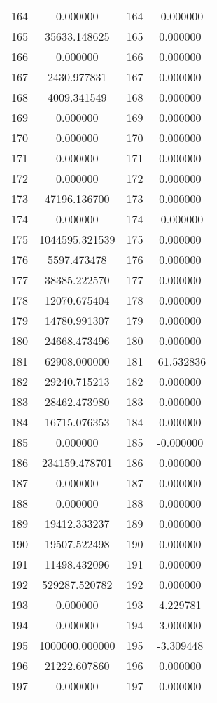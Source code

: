 \documentclass[12pt]{article}
\begin{document}
\begin{longtable}{@{}cccc@{}}
164 & 0.000000 & 164 & -0.000000 \\
165 & 35633.148625 & 165 & 0.000000 \\
166 & 0.000000 & 166 & 0.000000 \\
167 & 2430.977831 & 167 & 0.000000 \\
168 & 4009.341549 & 168 & 0.000000 \\
169 & 0.000000 & 169 & 0.000000 \\
170 & 0.000000 & 170 & 0.000000 \\
171 & 0.000000 & 171 & 0.000000 \\
172 & 0.000000 & 172 & 0.000000 \\
173 & 47196.136700 & 173 & 0.000000 \\
174 & 0.000000 & 174 & -0.000000 \\
175 & 1044595.321539 & 175 & 0.000000 \\
176 & 5597.473478 & 176 & 0.000000 \\
177 & 38385.222570 & 177 & 0.000000 \\
178 & 12070.675404 & 178 & 0.000000 \\
179 & 14780.991307 & 179 & 0.000000 \\
180 & 24668.473496 & 180 & 0.000000 \\
181 & 62908.000000 & 181 & -61.532836 \\
182 & 29240.715213 & 182 & 0.000000 \\
183 & 28462.473980 & 183 & 0.000000 \\
184 & 16715.076353 & 184 & 0.000000 \\
185 & 0.000000 & 185 & -0.000000 \\
186 & 234159.478701 & 186 & 0.000000 \\
187 & 0.000000 & 187 & 0.000000 \\
188 & 0.000000 & 188 & 0.000000 \\
189 & 19412.333237 & 189 & 0.000000 \\
190 & 19507.522498 & 190 & 0.000000 \\
191 & 11498.432096 & 191 & 0.000000 \\
192 & 529287.520782 & 192 & 0.000000 \\
193 & 0.000000 & 193 & 4.229781 \\
194 & 0.000000 & 194 & 3.000000 \\
195 & 1000000.000000 & 195 & -3.309448 \\
196 & 21222.607860 & 196 & 0.000000 \\
197 & 0.000000 & 197 & 0.000000 \\

\end{longtable}
\end{document}
